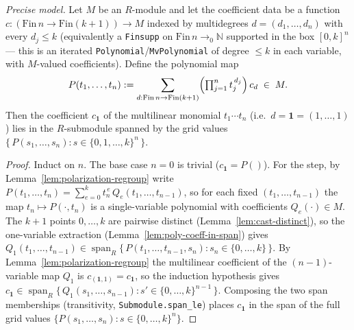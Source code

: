 \begin{lemma}
    \label{lem:multivariate-polarization}
    \emph{Precise model.} Let $M$ be an $R$-module and let the coefficient data be a function
    $c : (\mathrm{Fin}\,n \to \mathrm{Fin}(k+1)) \to M$ indexed by multidegrees
    $d = (d_1, \ldots, d_n)$ with every $d_j \le k$ (equivalently a \texttt{Finsupp} on
    $\mathrm{Fin}\,n \to_0 \mathbb{N}$ supported in the box $[0,k]^n$ — this is an iterated
    \texttt{Polynomial}/\texttt{MvPolynomial} of degree $\le k$ in each variable, with $M$-valued
    coefficients). Define the polynomial map
    \[
        P(t_1, \ldots, t_n) := \sum_{d : \mathrm{Fin}\,n \to \mathrm{Fin}(k+1)}
            \Bigl(\textstyle\prod_{j=1}^{n} t_j^{\,d_j}\Bigr)\, c_d \;\in\; M .
    \]
    Then the coefficient $c_{\mathbf 1}$ of the multilinear monomial $t_1 \cdots t_n$ (i.e.\ $d = \mathbf 1 =
    (1, \ldots, 1)$) lies in the $R$-submodule spanned by the grid values
    $\{\, P(s_1, \ldots, s_n) : s \in \{0, 1, \ldots, k\}^n \,\}$.
\end{lemma}
\begin{proof}
    Induct on $n$. The base case $n = 0$ is trivial ($c_{\mathbf 1} = P()$). For the step, by
    Lemma~\ref{lem:polarization-regroup} write $P(t_1,\ldots,t_n) = \sum_{e=0}^{k} t_n^{\,e}\,
    Q_e(t_1,\ldots,t_{n-1})$, so for each fixed $(t_1,\ldots,t_{n-1})$ the map $t_n \mapsto P(\cdot,t_n)$ is a
    single-variable polynomial with coefficients $Q_e(\cdot) \in M$. The $k+1$ points $0,\ldots,k$ are
    pairwise distinct (Lemma~\ref{lem:cast-distinct}), so the one-variable extraction
    (Lemma~\ref{lem:poly-coeff-in-span}) gives $Q_1(t_1,\ldots,t_{n-1}) \in \operatorname{span}_R\{\,
    P(t_1,\ldots,t_{n-1}, s_n) : s_n \in \{0,\ldots,k\}\,\}$. By Lemma~\ref{lem:polarization-regroup} the
    multilinear coefficient of the $(n-1)$-variable map $Q_1$ is $c_{(\mathbf 1,1)} = c_{\mathbf 1}$, so the
    induction hypothesis gives $c_{\mathbf 1} \in \operatorname{span}_R\{\, Q_1(s_1,\ldots,s_{n-1}) : s' \in
    \{0,\ldots,k\}^{n-1}\,\}$. Composing the two span memberships (transitivity, \texttt{Submodule.span\_le})
    places $c_{\mathbf 1}$ in the span of the full grid values $\{P(s_1,\ldots,s_n) : s \in
    \{0,\ldots,k\}^n\}$.
\end{proof}

